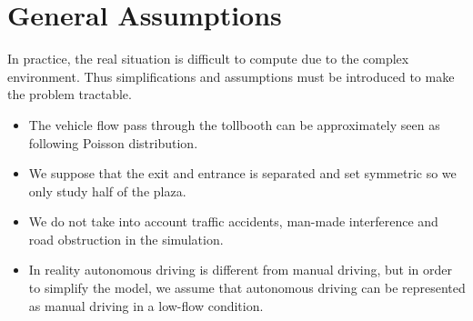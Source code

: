 \documentclass{mcmthesis}
\begin{document}
\section{General Assumptions}
In practice, the real situation is difficult to compute due to the complex environment. Thus simplifications and assumptions must be introduced to make the problem tractable.
\begin{itemize}
	\item The vehicle flow pass through the tollbooth can be approximately seen as following Poisson distribution\cite{gerlough1955use}.
	\item We suppose that the exit and entrance is separated and set symmetric so we only study half of the plaza.
	\item We do not take into account traffic accidents, man-made interference and road obstruction in the simulation.
	\item In reality autonomous driving is different from manual driving, but in order to simplify the model, we assume that autonomous driving can be represented as manual driving in a low-flow condition.
\end{itemize}
\end{document}

